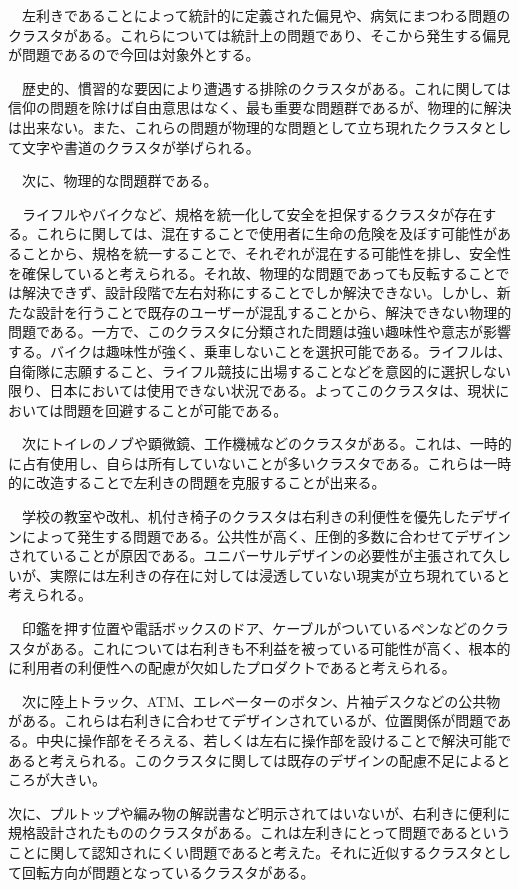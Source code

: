 \documentclass{jsarticle}
\begin{document}
　左利きであることによって統計的に定義された偏見や、病気にまつわる問題のクラスタがある。これらについては統計上の問題であり、そこから発生する偏見が問題であるので今回は対象外とする。

　歴史的、慣習的な要因により遭遇する排除のクラスタがある。これに関しては信仰の問題を除けば自由意思はなく、最も重要な問題群であるが、物理的に解決は出来ない。また、これらの問題が物理的な問題として立ち現れたクラスタとして文字や書道のクラスタが挙げられる。

　次に、物理的な問題群である。

　ライフルやバイクなど、規格を統一化して安全を担保するクラスタが存在する。これらに関しては、混在することで使用者に生命の危険を及ぼす可能性があることから、規格を統一することで、それぞれが混在する可能性を排し、安全性を確保していると考えられる。それ故、物理的な問題であっても反転することでは解決できず、設計段階で左右対称にすることでしか解決できない。しかし、新たな設計を行うことで既存のユーザーが混乱することから、解決できない物理的問題である。一方で、このクラスタに分類された問題は強い趣味性や意志が影響する。バイクは趣味性が強く、乗車しないことを選択可能である。ライフルは、自衛隊に志願すること、ライフル競技に出場することなどを意図的に選択しない限り、日本においては使用できない状況である。よってこのクラスタは、現状においては問題を回避することが可能である。

　次にトイレのノブや顕微鏡、工作機械などのクラスタがある。これは、一時的に占有使用し、自らは所有していないことが多いクラスタである。これらは一時的に改造することで左利きの問題を克服することが出来る。

　学校の教室や改札、机付き椅子のクラスタは右利きの利便性を優先したデザインによって発生する問題である。公共性が高く、圧倒的多数に合わせてデザインされていることが原因である。ユニバーサルデザインの必要性が主張されて久しいが、実際には左利きの存在に対しては浸透していない現実が立ち現れていると考えられる。

　印鑑を押す位置や電話ボックスのドア、ケーブルがついているペンなどのクラスタがある。これについては右利きも不利益を被っている可能性が高く、根本的に利用者の利便性への配慮が欠如したプロダクトであると考えられる。

　次に陸上トラック、ATM、エレベーターのボタン、片袖デスクなどの公共物がある。これらは右利きに合わせてデザインされているが、位置関係が問題である。中央に操作部をそろえる、若しくは左右に操作部を設けることで解決可能であると考えられる。このクラスタに関しては既存のデザインの配慮不足によるところが大きい。

次に、プルトップや編み物の解説書など明示されてはいないが、右利きに便利に規格設計されたもののクラスタがある。これは左利きにとって問題であるということに関して認知されにくい問題であると考えた。それに近似するクラスタとして回転方向が問題となっているクラスタがある。
\end{document}

